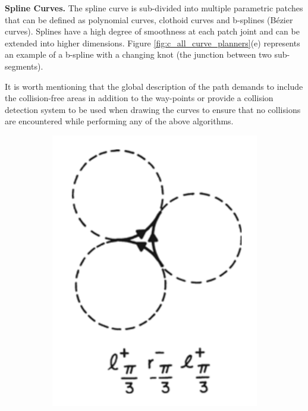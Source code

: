 \textbf{Spline Curves.} The spline curve is sub-divided into multiple parametric patches that can be defined as polynomial curves, clothoid curves and b-splines (Bézier curves). Splines have a high degree of smoothness at each patch joint and can be extended into higher dimensions. Figure \ref{fig:c_all_curve_planners}(e) represents an example of a b-spline with a changing knot (the junction between two sub-segments).

It is worth mentioning that the global description of the path demands to include the collision-free areas in addition to the way-points or provide a collision detection system to be used when drawing the curves to ensure that no collisions are encountered while performing any of the above algorithms.

\begin{figure}[h!]
  \centering
  \begin{subfigure}[b]{0.22\linewidth}
    \includegraphics[width=\linewidth]{images/c_lines_and_circles.png}

\end{subfigure}
\end{figure}
